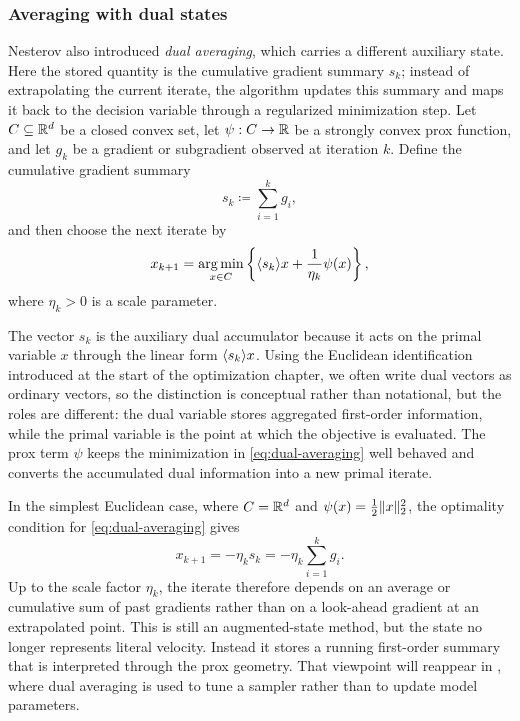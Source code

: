 \subsubsection{Averaging with dual states}
\label{subsubsec:dual-averaging}

Nesterov also introduced \emph{dual averaging}, which carries a different auxiliary state.
Here the stored quantity is the cumulative gradient summary $s_k$; instead of extrapolating the current iterate, the algorithm updates this summary and maps it back to the decision variable through a regularized minimization step.
Let $C\subseteq\mathbb{R}^d$ be a closed convex set, let $\psi:C\to\mathbb{R}$ be a strongly convex prox function, and let $g_k$ be a gradient or subgradient observed at iteration $k$.
Define the cumulative gradient summary
\[
  s_k \coloneqq \sum_{i=1}^k g_i,
\]
and then choose the next iterate by
\begin{equation}
  x_{k+1}
  = \operatorname*{arg\,min}_{x\in C}
    \left\{
      \langle s_k\rangle{x} + \frac{1}{\eta_k}\psi(x)
    \right\},
  \label{eq:dual-averaging}
\end{equation}
where $\eta_k>0$ is a scale parameter.

The vector $s_k$ is the auxiliary dual accumulator because it acts on the primal variable $x$ through the linear form $\langle s_k\rangle{x}$.
Using the Euclidean identification introduced at the start of the optimization chapter, we often write dual vectors as ordinary vectors, so the distinction is conceptual rather than notational, but the roles are different:
the dual variable stores aggregated first-order information, while the primal variable is the point at which the objective is evaluated.
The prox term $\psi$ keeps the minimization in \eqref{eq:dual-averaging} well behaved and converts the accumulated dual information into a new primal iterate.

In the simplest Euclidean case, where $C=\mathbb{R}^d$ and $\psi(x)=\frac12\lVert x\rVert_2^2$, the optimality condition for \eqref{eq:dual-averaging} gives
\[
  x_{k+1} = -\eta_k s_k = -\eta_k \sum_{i=1}^k g_i.
\]
Up to the scale factor $\eta_k$, the iterate therefore depends on an average or cumulative sum of past gradients rather than on a look-ahead gradient at an extrapolated point.
This is still an augmented-state method, but the state no longer represents literal velocity.
Instead it stores a running first-order summary that is interpreted through the prox geometry.
That viewpoint will reappear in , where dual averaging is used to tune a sampler rather than to update model parameters.

